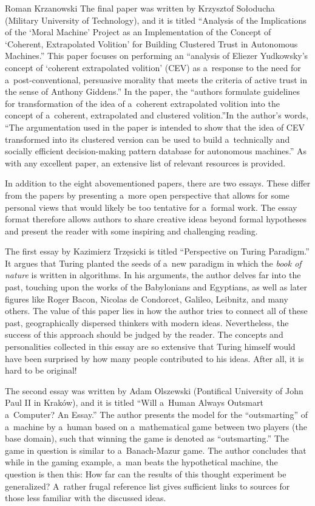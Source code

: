 \begin{editorialeng}{Roman Krzanowski}
The final paper was written by Krzysztof Sołoducha (Military University of Technology), and it is titled ``Analysis of the Implications of the ‘Moral Machine' Project as an Implementation of the Concept of ‘Coherent, Extrapolated Volition' for Building Clustered Trust in Autonomous Machines.'' This paper focuses on performing an ``analysis of Eliezer Yudkowsky's concept of ‘coherent extrapolated volition' (CEV) as a~response to the need for a~post-conventional, persuasive morality that meets the criteria of active trust in the sense of Anthony Giddens.'' In the paper, the ``authors formulate guidelines for transformation of the idea of a~coherent extrapolated volition into the concept of a~coherent, extrapolated and clustered volition.''In the author's words, ``The argumentation used in the paper is intended to show that the idea of CEV transformed into its clustered version can be used to build a~technically and socially efficient decision-making pattern database for autonomous machines.'' As with any excellent paper, an extensive list of relevant resources is provided.

In addition to the eight abovementioned papers, there are two essays. These differ from the papers by presenting a~more open perspective that allows for some personal views that would likely be too tentative for a~formal work. The essay format therefore allows authors to share creative ideas beyond formal hypotheses and present the reader with some inspiring and challenging reading.

The first essay by Kazimierz Trzęsicki is titled ``Perspective on Turing Paradigm.'' It argues that Turing planted the seeds of a~new paradigm in which the \textit{book of nature} is written in algorithms. In his arguments, the author delves far into the past, touching upon the works of the Babylonians and Egyptians, as well as later figures like Roger Bacon, Nicolas de Condorcet, Galileo, Leibnitz, and many others. The value of this paper lies in how the author tries to connect all of these past, geographically dispersed thinkers with modern ideas. Nevertheless, the success of this approach should be judged by the reader. The concepts and personalities collected in this essay are so extensive that Turing himself would have been surprised by how many people contributed to his ideas. After all, it is hard to be original!

The second essay was written by Adam Olszewski (Pontifical University of John Paul II in Kraków), and it is titled ``Will a~Human Always Outsmart a~Computer? An Essay.'' The author presents the model for the ``outsmarting'' of a~machine by a~human based on a~mathematical game between two players (the base domain), such that winning the game is denoted as ``outsmarting.'' The game in question is similar to a~Banach-Mazur game. The author concludes that while in the gaming example, a~man beats the hypothetical machine, the question is then this: How far can the results of this thought experiment be generalized? A~rather frugal reference list gives sufficient links to sources for those less familiar with the discussed ideas.


\end{editorialeng}
